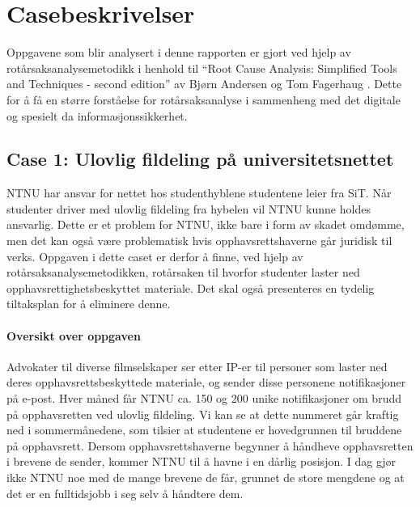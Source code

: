 \chapter{Casebeskrivelser}
\label{kap:casebeskrivelser}
Oppgavene som blir analysert i denne rapporten er gjort ved hjelp av rotårsaksanalysemetodikk i henhold til ``Root Cause Analysis: Simplified Tools and Techniques - second edition'' av Bjørn Andersen og Tom Fagerhaug \cite{RCA}. Dette for å få en større forståelse for rotårsaksanalyse i sammenheng med det digitale og spesielt da informasjonssikkerhet.

\section{Case 1: Ulovlig fildeling på universitetsnettet}
\label{sec:case_fildeling}
NTNU har ansvar for nettet hos studenthyblene studentene leier fra SiT. Når studenter driver med ulovlig fildeling fra hybelen vil NTNU kunne holdes ansvarlig. Dette er et problem for NTNU, ikke bare i form av skadet omdømme, men det kan også være problematisk hvis opphavsrettshaverne går juridisk til verks. Oppgaven i dette caset er derfor å finne, ved hjelp av rotårsaksanalysemetodikken, rotårsaken til hvorfor studenter laster ned opphavsrettighetsbeskyttet materiale. Det skal også presenteres en tydelig tiltaksplan for å eliminere denne.

\subsubsection{Oversikt over oppgaven}
Advokater til diverse filmselskaper ser etter IP-er til personer som laster ned deres opphavsrettsbeskyttede materiale, og sender disse personene notifikasjoner på e-post. Hver måned får NTNU ca. 150 og 200 unike notifikasjoner om brudd på opphavsretten ved ulovlig fildeling. Vi kan se at dette nummeret går kraftig ned i sommermånedene, som tilsier at studentene er hovedgrunnen til bruddene på opphavsrett. Dersom opphavsrettshaverne begynner å håndheve opphavsretten i brevene de sender, kommer NTNU til å havne i en dårlig posisjon. I dag gjør ikke NTNU noe med de mange brevene de får, grunnet de store mengdene og at det er en fulltidsjobb i seg selv å håndtere dem.


